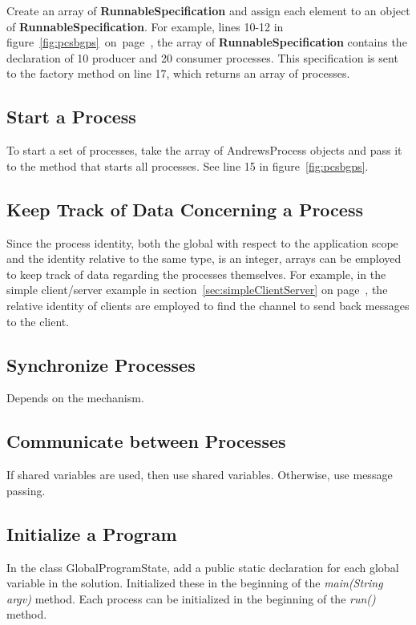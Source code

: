 \documentclass[11pt]{article} %
\begin{document}
 Create an array of {\bfseries RunnableSpecification} and assign each element to an object of {\bfseries RunnableSpecification}. For example, lines 10-12 in figure~\ref{fig:pcsbgps}~on~page~\pageref{fig:pcsbgps}, the array of {\bfseries RunnableSpecification} contains the declaration of 10 producer and 20 consumer processes.  This specification is sent to the factory method on line 17, which returns an array of processes. 

\subsection{Start a Process}
To start a set of processes, take the array of AndrewsProcess objects and pass it to the method that starts all processes. See line 15 in figure~\ref{fig:pcsbgps}.

\subsection{Keep Track of Data Concerning a Process}

Since the process identity, both the global with respect to the application scope and the identity relative to the same type, is an integer, arrays can be employed to keep track of data regarding the processes themselves. For example, in the simple client/server example in section~\ref{sec:simpleClientServer} on page~\pageref{sec:simpleClientServer}, the relative identity of clients are employed to find the channel to send back messages to the client. 

\subsection{Synchronize Processes}

Depends on the mechanism. 

\subsection{Communicate between Processes}

If shared variables are used, then use shared variables. Otherwise, use message passing. 

\subsection{Initialize a Program}
In the class GlobalProgramState, add a public static declaration for each global variable in the solution. Initialized these in the beginning of the \emph{main(String argv)} method. Each process can be initialized in the beginning of the \emph{run()} method. 





\end{document}

